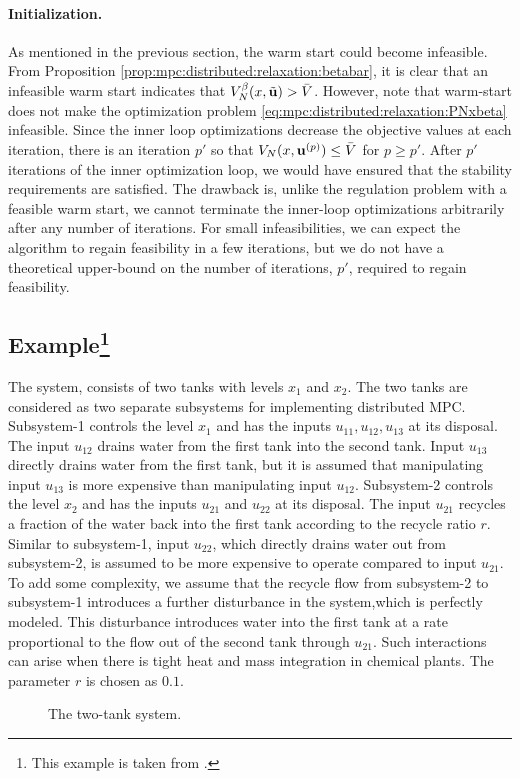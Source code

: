 \paragraph{Initialization.} As mentioned in the previous section, the
warm start could become infeasible. From Proposition
\ref{prop:mpc:distributed:relaxation:betabar}, it is clear that an infeasible warm start
indicates that $V^\beta_N(x,\tilde{\mathbf{u}}) > \bar{V}$. However, note that
warm-start does not make the optimization problem \eqref{eq:mpc:distributed:relaxation:PNxbeta}
infeasible. Since the inner loop optimizations decrease the objective
values at each iteration, there is an iteration $p'$ so that  $V_N(x,\mathbf{u}^{(p)})
\leq \bar{V}$ for $p \geq p'$.  
After $p'$ iterations of the inner optimization loop, we would have 
ensured that the stability requirements are satisfied. The drawback is, unlike the regulation problem
with a feasible warm start, we cannot terminate the inner-loop
optimizations arbitrarily after any number of iterations. For small
infeasibilities, we can expect the algorithm to regain feasibility in
a few iterations, but we do not have a theoretical upper-bound on the
number of iterations, $p'$, required to regain feasibility.


\subsection{Example\footnote{This example is taken from  \citet{subramanian:rawlings:maravelias:2012}.}}
\label{sec:mpc:distributed:example}


The system, consists of two tanks with levels $x_1$ and $x_2$. The two
tanks are considered as two separate subsystems for 
implementing distributed MPC.  Subsystem-1 controls the level $x_1$ and has the inputs
$u_{11},u_{12},u_{13}$ at its disposal. The input $u_{12}$ drains
water from the first tank into the second tank. Input $u_{13}$
directly drains water from the first tank, but it is assumed that
manipulating input $u_{13}$ is more expensive than manipulating
input $u_{12}$. Subsystem-2 controls the level $x_2$ and has the inputs $u_{21}$ and
$u_{22}$ at its disposal. The input $u_{21}$ recycles a fraction of the
water back into the first tank according to the recycle ratio
$r$. Similar to subsystem-1, input $u_{22}$, which directly drains
water out from subsystem-2, is assumed to be more expensive to operate
compared to input $u_{21}$. To add some complexity, we assume that the recycle flow from subsystem-2 to subsystem-1
introduces a further disturbance in the system,which is perfectly
modeled.
This disturbance  introduces water into the first tank  at a rate
proportional to the flow out of the second tank through
$u_{21}$. Such interactions can arise when there is tight heat and
mass integration in chemical plants. The parameter $r$ is chosen as $0.1$.
\begin{figure}
\centering
{\resizebox{0.75\textwidth}{!}{}}
\caption{The two-tank system.}
\label{fig:2tankunstable}
\end{figure}

